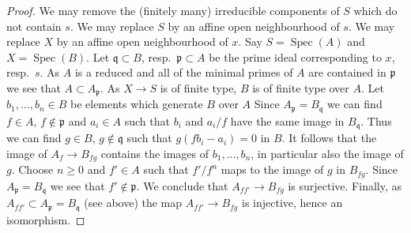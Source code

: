 \documentclass[10pt,a4paper]{amsart}
\theoremstyle{plain}
\theoremstyle{definition}
\theoremstyle{remark}
\numberwithin{equation}{subsection}
\def\Spec{\mathop{\mathrm{Spec}}}
\begin{document}
\begin{proof}
We may remove the (finitely many) irreducible components of $S$
which do not contain $s$. We may replace $S$ by an affine open
neighbourhood of $s$. We may replace $X$ by an affine open neighbourhood
of $x$. Say $S = \Spec(A)$ and $X = \Spec(B)$. Let $\mathfrak q \subset B$,
resp.\ $\mathfrak p \subset A$ be the prime ideal corresponding to $x$,
resp.\ $s$. As $A$ is a reduced and all of the minimal primes of
$A$ are contained in $\mathfrak p$ we see that $A \subset A_\mathfrak p$.
As $X \to S$ is of finite type, $B$ is of finite type over $A$.
Let $b_1, \ldots, b_n \in B$ be elements which generate $B$ over $A$
Since $A_\mathfrak p = B_\mathfrak q$ we can find
$f \in A$, $f \not \in \mathfrak p$
and $a_i \in A$ such that $b_i$ and $a_i/f$ have the same image
in $B_\mathfrak q$. Thus we can find $g \in B$, $g \not \in \mathfrak q$
such that $g(fb_i - a_i) = 0$ in $B$. It follows that the image of
$A_f \to B_{fg}$ contains the images of $b_1, \ldots, b_n$, in
particular also the image of $g$.
Choose $n \geq 0$ and $f' \in A$ such that $f'/f^n$ maps
to the image of $g$ in $B_{fg}$. Since $A_\mathfrak p = B_\mathfrak q$
we see that $f' \not \in \mathfrak p$.
We conclude that $A_{ff'} \to B_{fg}$ is surjective.
Finally, as $A_{ff'} \subset A_\mathfrak p = B_\mathfrak q$ (see above)
the map $A_{ff'} \to B_{fg}$ is injective, hence an isomorphism.
\end{proof}
\end{document}
